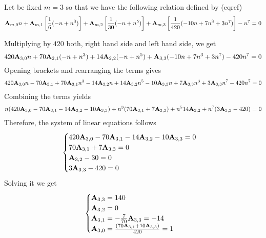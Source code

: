 \begin{examp}
    Let be fixed $m=3$ so that we have the following relation defined by (eqref)
    \begin{equation*}
        {\mathbf{A}} \sb{m,0} n
        + {\mathbf{A}} \sb{m,1} \left[ \frac{1}{6} (-n + n^3) \right]
        + {\mathbf{A}} \sb{m,2} \left[ \frac{1}{30} (-n + n^5) \right]
        + {\mathbf{A}} \sb{m,3} \left[ \frac{1}{420} (-10 n + 7 n^3 + 3 n^7) \right] - n^7 = 0
    \end{equation*}
\end{examp}
Multiplying by $420$ both, right hand side and left hand side, we get
\begin{equation*}
    420 {\mathbf{A}} \sb{3,0} n + 70 {\mathbf{A}} \sb{2,1} (-n + n^3) + 14 {\mathbf{A}} \sb{2,2} (-n + n^5) + {\mathbf{A}} \sb{3,3} (-10 n + 7 n^3 + 3 n^7) - 420n^7 = 0
\end{equation*}
Opening brackets and rearranging the terms gives
\begin{equation*}
    \begin{split}
        420 {\mathbf{A}} \sb{3,0} n - 70 {\mathbf{A}} \sb{3,1} + 70 {\mathbf{A}} \sb{3,1} n^3 - 14 {\mathbf{A}} \sb{3,2} n + 14 {\mathbf{A}} \sb{3,2} n^5
        - 10 {\mathbf{A}} \sb{3,3} n + 7 {\mathbf{A}} \sb{3,3} n^3 + 3 {\mathbf{A}} \sb{3,3} n^7 - 420n^7 = 0
    \end{split}
\end{equation*}
Combining the terms yields
\begin{equation*}
    \begin{split}
        n (420 {\mathbf{A}} \sb{3,0} - 70 {\mathbf{A}} \sb{3,1} - 14 {\mathbf{A}} \sb{3,2} - 10 {\mathbf{A}} \sb{3,3})
        + n^3 (70 {\mathbf{A}} \sb{3,1} + 7 {\mathbf{A}} \sb{3,3})
        + n^5 14 {\mathbf{A}} \sb{3,2}
        + n^7 (3 {\mathbf{A}} \sb{3,3} - 420)
        = 0
    \end{split}
\end{equation*}
Therefore, the system of linear equations follows
\begin{equation*}
    \begin{cases}
        420 {\mathbf{A}} \sb{3,0} - 70 {\mathbf{A}} \sb{3,1} - 14 {\mathbf{A}} \sb{3,2} - 10 {\mathbf{A}} \sb{3,3} = 0 \\
        70 {\mathbf{A}} \sb{3,1} + 7 {\mathbf{A}} \sb{3,3} = 0 \\
        {\mathbf{A}} \sb{3,2} - 30 = 0 \\
        3 {\mathbf{A}} \sb{3,3} - 420 = 0
    \end{cases}
\end{equation*}
Solving it we get
\begin{equation*}
    \begin{cases}
        {\mathbf{A}} \sb{3,3} = 140 \\
        {\mathbf{A}} \sb{3,2} = 0 \\
        {\mathbf{A}} \sb{3,1} = -\frac{7}{70} {\mathbf{A}} \sb{3,3} = -14 \\
        {\mathbf{A}} \sb{3,0} = \frac{(70 {\mathbf{A}} \sb{3,1} + 10 {\mathbf{A}} \sb{3,3})}{420} = 1
    \end{cases}
\end{equation*}
